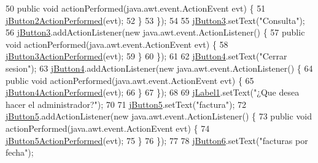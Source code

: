 \begin{DoxyCode}
50             \textcolor{keyword}{public} \textcolor{keywordtype}{void} actionPerformed(java.awt.event.ActionEvent evt) \{
51                 \mbox{\hyperlink{class_interfaz_package_1_1_interfaz_admin_a11a622906a9352165bce2b478ff0111c}{jButton2ActionPerformed}}(evt);
52             \}
53         \});
54 
55         \mbox{\hyperlink{class_interfaz_package_1_1_interfaz_admin_a1c49c5af96e421af2c0e3e773995db35}{jButton3}}.setText(\textcolor{stringliteral}{"Consulta"});
56         \mbox{\hyperlink{class_interfaz_package_1_1_interfaz_admin_a1c49c5af96e421af2c0e3e773995db35}{jButton3}}.addActionListener(\textcolor{keyword}{new} java.awt.event.ActionListener() \{
57             \textcolor{keyword}{public} \textcolor{keywordtype}{void} actionPerformed(java.awt.event.ActionEvent evt) \{
58                 \mbox{\hyperlink{class_interfaz_package_1_1_interfaz_admin_a9ac69474400fb921a3fd1118bdd5b5c5}{jButton3ActionPerformed}}(evt);
59             \}
60         \});
61 
62         \mbox{\hyperlink{class_interfaz_package_1_1_interfaz_admin_abe45cfffa25b1f68f153eb8dfed74132}{jButton4}}.setText(\textcolor{stringliteral}{"Cerrar sesion"});
63         \mbox{\hyperlink{class_interfaz_package_1_1_interfaz_admin_abe45cfffa25b1f68f153eb8dfed74132}{jButton4}}.addActionListener(\textcolor{keyword}{new} java.awt.event.ActionListener() \{
64             \textcolor{keyword}{public} \textcolor{keywordtype}{void} actionPerformed(java.awt.event.ActionEvent evt) \{
65                 \mbox{\hyperlink{class_interfaz_package_1_1_interfaz_admin_a181786d770ad10741a8673d921056f35}{jButton4ActionPerformed}}(evt);
66             \}
67         \});
68 
69         \mbox{\hyperlink{class_interfaz_package_1_1_interfaz_admin_a616ba73f041fc46fb10107d67b98f5ad}{jLabel1}}.setText(\textcolor{stringliteral}{"¿Que desea hacer el administrador?"});
70 
71         \mbox{\hyperlink{class_interfaz_package_1_1_interfaz_admin_a158621407bca85eb067b4d84fb15f8f8}{jButton5}}.setText(\textcolor{stringliteral}{"factura"});
72         \mbox{\hyperlink{class_interfaz_package_1_1_interfaz_admin_a158621407bca85eb067b4d84fb15f8f8}{jButton5}}.addActionListener(\textcolor{keyword}{new} java.awt.event.ActionListener() \{
73             \textcolor{keyword}{public} \textcolor{keywordtype}{void} actionPerformed(java.awt.event.ActionEvent evt) \{
74                 \mbox{\hyperlink{class_interfaz_package_1_1_interfaz_admin_a25699f2c1e5c4e59cac723216e386837}{jButton5ActionPerformed}}(evt);
75             \}
76         \});
77 
78         \mbox{\hyperlink{class_interfaz_package_1_1_interfaz_admin_aed43fc05f792f94859d625d8c69e9858}{jButton6}}.setText(\textcolor{stringliteral}{"facturas por fecha"});

\end{DoxyCode}

